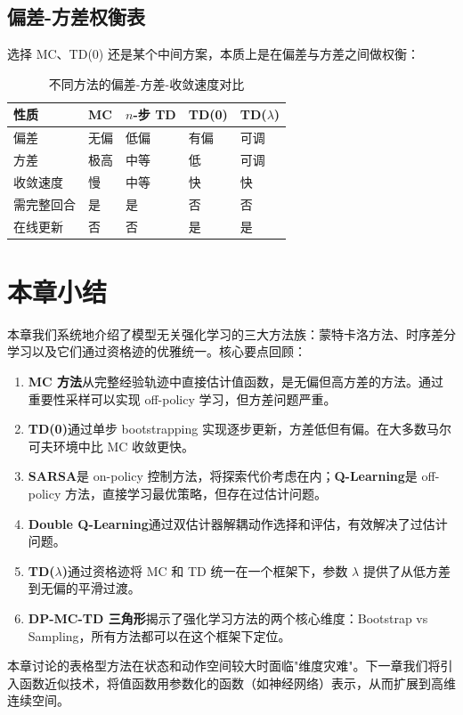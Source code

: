 \subsection{偏差-方差权衡表}

选择 MC、TD(0) 还是某个中间方案，本质上是在偏差与方差之间做权衡：

\begin{table}[H]
\centering
\caption{不同方法的偏差-方差-收敛速度对比}
\begin{tabular}{@{}p{2.5cm}p{2.5cm}p{2.5cm}p{2.5cm}p{2.5cm}@{}}
\toprule
性质 & MC & $n$-步 TD & TD(0) & TD($\lambda$) \\
\midrule
偏差 & 无偏 & 低偏 & 有偏 & 可调 \\
方差 & 极高 & 中等 & 低 & 可调 \\
收敛速度 & 慢 & 中等 & 快 & 快 \\
需完整回合 & 是 & 是 & 否 & 否 \\
在线更新 & 否 & 否 & 是 & 是 \\
\bottomrule
\end{tabular}
\end{table}

\section{本章小结}

本章我们系统地介绍了模型无关强化学习的三大方法族：蒙特卡洛方法、时序差分学习以及它们通过资格迹的优雅统一。核心要点回顾：

\begin{enumerate}
    \item \textbf{MC 方法}从完整经验轨迹中直接估计值函数，是无偏但高方差的方法。通过重要性采样可以实现 off-policy 学习，但方差问题严重。
    \item \textbf{TD(0)}通过单步 bootstrapping 实现逐步更新，方差低但有偏。在大多数马尔可夫环境中比 MC 收敛更快。
    \item \textbf{SARSA}是 on-policy 控制方法，将探索代价考虑在内；\textbf{Q-Learning}是 off-policy 方法，直接学习最优策略，但存在过估计问题。
    \item \textbf{Double Q-Learning}通过双估计器解耦动作选择和评估，有效解决了过估计问题。
    \item \textbf{TD($\lambda$)}通过资格迹将 MC 和 TD 统一在一个框架下，参数 $\lambda$ 提供了从低方差到无偏的平滑过渡。
    \item \textbf{DP-MC-TD 三角形}揭示了强化学习方法的两个核心维度：Bootstrap vs Sampling，所有方法都可以在这个框架下定位。
\end{enumerate}

本章讨论的表格型方法在状态和动作空间较大时面临"维度灾难"。下一章我们将引入函数近似技术，将值函数用参数化的函数（如神经网络）表示，从而扩展到高维连续空间。
